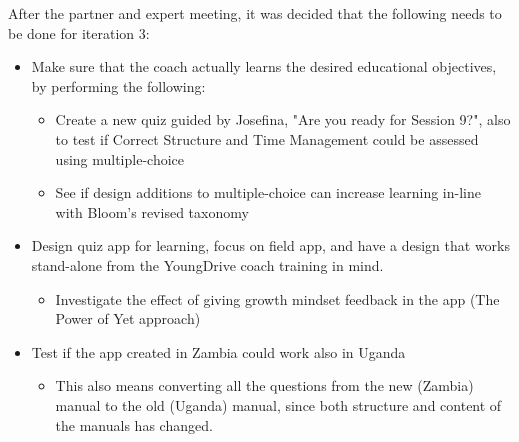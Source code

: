 After the partner and expert meeting, it was decided that the following needs to be done for iteration 3:

\begin{itemize}
  \item Make sure that the coach actually learns the desired educational objectives, by performing the following:
  \begin{itemize}
    \item Create a new quiz guided by Josefina, "Are you ready for Session 9?", also to test if Correct Structure and Time Management could be assessed using multiple-choice
    \item See if design additions to multiple-choice can increase learning in-line with Bloom's revised taxonomy
  \end{itemize}
  \item Design quiz app for learning, focus on field app, and have a design that works stand-alone from the YoungDrive coach training in mind.
  \begin{itemize}
    \item Investigate the effect of giving growth mindset feedback in the app (The Power of Yet approach)
  \end{itemize}
  \item Test if the app created in Zambia could work also in Uganda
    \begin{itemize}
      \item This also means converting all the questions from the new (Zambia) manual to the old (Uganda) manual, since both structure and content of the manuals has changed.
    \end{itemize}
\end{itemize}
